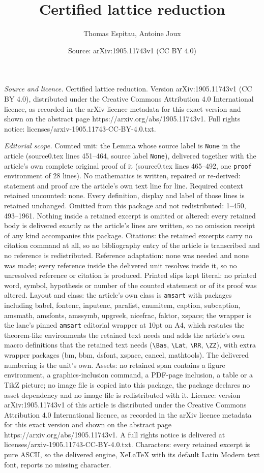 \documentclass[10pt,a4paper]{amsart}
\title[Certified lattice reduction]{Certified lattice reduction}
\author{Thomas Espitau, Antoine Joux}
\date{Source: arXiv:1905.11743v1 (CC BY 4.0)}
\begin{document}
\maketitle

\noindent\emph{Source and licence.} Certified lattice reduction. Version arXiv:1905.11743v1 (CC BY 4.0), distributed under the Creative Commons Attribution 4.0 International licence, as recorded in the arXiv licence metadata for this exact version and shown on the abstract page https://arxiv.org/abs/1905.11743v1. Full rights notice: licenses/arxiv-1905.11743-CC-BY-4.0.txt.\par\smallskip

\noindent\textit{Editorial scope.} Counted unit: the Lemma whose source label is \texttt{None} in the article (source0.tex lines 451--464, source label \texttt{None}), delivered together with the article's own complete original proof of it (source0.tex lines 465--492, one \texttt{proof} environment of 28 lines). No mathematics is written, repaired or re-derived: statement and proof are the article's own text line for line. Required context retained uncounted: none. Every definition, display and label of those lines is retained unchanged. Omitted from this package and not redistributed: 1--450, 493--1961. Nothing inside a retained excerpt is omitted or altered: every retained body is delivered exactly as the article's lines are written, so no omission receipt of any kind accompanies this package. Citations: the retained excerpts carry no citation command at all, so no bibliography entry of the article is transcribed and no reference is redistributed. Reference adaptation: none was needed and none was made; every reference inside the delivered unit resolves inside it, so no unresolved reference or citation is produced. Printed slips kept literal: no printed word, symbol, hypothesis or number of the counted statement or of its proof was altered. Layout and class: the article's own class is \texttt{amsart} with packages including babel, fontenc, inputenc, paralist, enumitem, caption, subcaption, amsmath, amsfonts, amssymb, upgreek, nicefrac, faktor, xspace; the wrapper is the lane's pinned \texttt{amsart} editorial wrapper at 10pt on A4, which restates the theorem-like environments the retained text needs and adds the article's own macro definitions that the retained text needs (\texttt{\textbackslash Bas}, \texttt{\textbackslash Lat}, \texttt{\textbackslash RR}, \texttt{\textbackslash ZZ}), with extra wrapper packages (bm, bbm, dsfont, xspace, cancel, mathtools). The delivered numbering is the unit's own. Assets: no retained span contains a figure environment, a graphics-inclusion command, a PDF-page inclusion, a table or a TikZ picture; no image file is copied into this package, the package declares no asset dependency and no image file is redistributed with it. Licence: version arXiv:1905.11743v1 of this article is distributed under the Creative Commons Attribution 4.0 International licence, as recorded in the arXiv licence metadata for this exact version and shown on the abstract page https://arxiv.org/abs/1905.11743v1. A full rights notice is delivered at licenses/arxiv-1905.11743-CC-BY-4.0.txt. Characters: every retained excerpt is pure ASCII, so the delivered engine, XeLaTeX with its default Latin Modern text font, reports no missing character.
\end{document}
